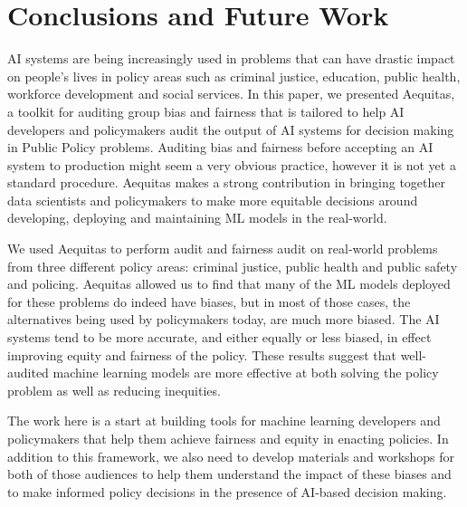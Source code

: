





\section{Conclusions and Future Work}
AI systems are being increasingly used in problems that can have drastic impact on people's lives in policy areas such as criminal justice, education, public health, workforce development and social services. In this paper, we presented Aequitas, a toolkit for auditing group bias and fairness that is tailored to help AI developers and policymakers audit the output of AI systems for decision making in Public Policy problems. Auditing bias and fairness before accepting an AI system to production might seem a very obvious practice, however it is not yet a standard procedure. Aequitas makes a strong contribution in bringing together data scientists and policymakers to make more equitable decisions around developing, deploying and maintaining ML models in the real-world.

We used Aequitas to perform audit and fairness audit on real-world problems from three different policy areas: criminal justice, public health and public safety and policing. Aequitas allowed us to find that many of the ML models deployed for these problems do indeed have biases, but in most of those cases, the alternatives being used by policymakers today, are much more biased. The AI systems tend to be more accurate, and either equally or less biased, in effect improving equity and fairness of the policy. These results suggest that well-audited machine learning models are more effective at both solving the policy problem as well as reducing inequities. 

The work here is a start at building tools for machine learning developers and policymakers that help them achieve fairness and equity in enacting policies. In addition to this framework, we also need to develop materials and workshops for both of those audiences to help them understand the impact of these biases and to make informed policy decisions in the presence of AI-based decision making.






